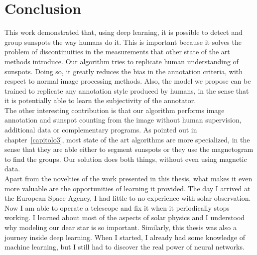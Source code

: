 \chapter{Conclusion}
\label{capitolo9}
\thispagestyle{empty}
\noindent This work demonstrated that, using deep learning, it is possible to detect and group sunspots the way humans do it. This is important because it solves the problem of discontinuities in the measurements that other state of the art methods introduce. Our algorithm tries to replicate human understanding of sunspots. Doing so, it greatly reduces the bias in the annotation criteria, with respect to normal image processing methods. Also, the model we propose can be trained to replicate any annotation style produced by humans, in the sense that it is potentially able to learn the subjectivity of the annotator.\\
The other interesting contribution is that our algorithm performs image annotation and sunspot counting from the image without human supervision, additional data or complementary programs. As pointed out in chapter~\autoref{capitolo3}, most state of the art algorithms are more specialized, in the sense that they are able either to segment sunspots or they use the magnetogram to find the groups. Our solution does both things, without even using magnetic data.\\
Apart from the novelties of the work presented in this thesis, what makes it even more valuable are the opportunities of learning it provided. The day I arrived at the European Space Agency, I had little to no experience with solar observation. Now I am able to operate a telescope and fix it when it periodically stops working. I learned about most of the aspects of solar physics and I understood why modeling our dear star is so important. Similarly, this thesis was also a journey inside deep learning. When I started, I already had some knowledge of machine learning, but I still had to discover the real power of neural networks.
